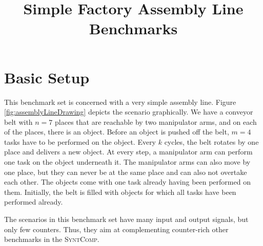 \documentclass[a4paper,10pt]{IEEEtran}
\author{\IEEEauthorblockN{R\"udiger Ehlers \\}
\IEEEauthorblockA{University of Bremen \& DFKI GmbH\\
Germany
}}
\newcommand{\SyntComp}{\textsc{SyntComp}}
\begin{document}
\title{Simple Factory Assembly Line Benchmarks}
\maketitle

\section{Basic Setup}
%
\noindent This benchmark set is concerned with a very simple assembly line. Figure \ref{fig:assemblyLineDrawing} depicts the scenario graphically. We have a conveyor belt with $n=7$ places that are reachable by two manipulator arms, and on each of the places, there is an object. Before an object is pushed off the belt, $m=4$ tasks have to be performed on the object. Every $k$ cycles, the belt rotates by one place and delivers a new object. At every step, a manipulator arm can perform one task on the object underneath it. The manipulator arms can also move by one place, but they can never be at the same place and can also not overtake each other. The objects come with one task already having been performed on them. Initially, the belt is filled with objects for which all tasks have been performed already.


The scenarios in this benchmark set have many input and output signals, but only few counters. Thus, they aim at complementing counter-rich other benchmarks in the \SyntComp.
\end{document}
